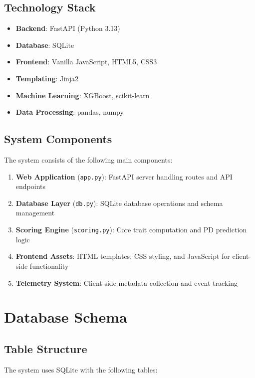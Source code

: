 \documentclass[11pt,a4paper]{article}
\begin{document}
\subsection{Technology Stack}
\begin{itemize}
    \item \textbf{Backend}: FastAPI (Python 3.13)
    \item \textbf{Database}: SQLite
    \item \textbf{Frontend}: Vanilla JavaScript, HTML5, CSS3
    \item \textbf{Templating}: Jinja2
    \item \textbf{Machine Learning}: XGBoost, scikit-learn
    \item \textbf{Data Processing}: pandas, numpy
\end{itemize}

\subsection{System Components}
The system consists of the following main components:

\begin{enumerate}
    \item \textbf{Web Application} (\texttt{app.py}): FastAPI server handling routes and API endpoints
    \item \textbf{Database Layer} (\texttt{db.py}): SQLite database operations and schema management
    \item \textbf{Scoring Engine} (\texttt{scoring.py}): Core trait computation and PD prediction logic
    \item \textbf{Frontend Assets}: HTML templates, CSS styling, and JavaScript for client-side functionality
    \item \textbf{Telemetry System}: Client-side metadata collection and event tracking
\end{enumerate}

\section{Database Schema}

\subsection{Table Structure}
The system uses SQLite with the following tables:
\end{document}
